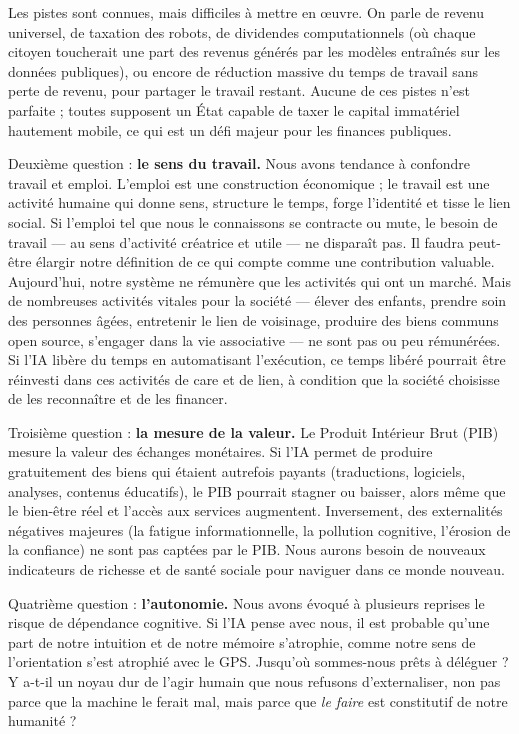 Les pistes sont connues, mais difficiles à mettre en œuvre. On parle de revenu universel, de taxation des robots, de dividendes computationnels (où chaque citoyen toucherait une part des revenus générés par les modèles entraînés sur les données publiques), ou encore de réduction massive du temps de travail sans perte de revenu, pour partager le travail restant. Aucune de ces pistes n'est parfaite ; toutes supposent un État capable de taxer le capital immatériel hautement mobile, ce qui est un défi majeur pour les finances publiques.

Deuxième question : \textbf{le sens du travail.} Nous avons tendance à confondre travail et emploi. L'emploi est une construction économique ; le travail est une activité humaine qui donne sens, structure le temps, forge l'identité et tisse le lien social. Si l'emploi tel que nous le connaissons se contracte ou mute, le besoin de travail — au sens d'activité créatrice et utile — ne disparaît pas. Il faudra peut-être élargir notre définition de ce qui compte comme une contribution valuable. Aujourd'hui, notre système ne rémunère que les activités qui ont un marché. Mais de nombreuses activités vitales pour la société — élever des enfants, prendre soin des personnes âgées, entretenir le lien de voisinage, produire des biens communs open source, s'engager dans la vie associative — ne sont pas ou peu rémunérées. Si l'IA libère du temps en automatisant l'exécution, ce temps libéré pourrait être réinvesti dans ces activités de care et de lien, à condition que la société choisisse de les reconnaître et de les financer.

Troisième question : \textbf{la mesure de la valeur.} Le Produit Intérieur Brut (PIB) mesure la valeur des échanges monétaires. Si l'IA permet de produire gratuitement des biens qui étaient autrefois payants (traductions, logiciels, analyses, contenus éducatifs), le PIB pourrait stagner ou baisser, alors même que le bien-être réel et l'accès aux services augmentent. Inversement, des externalités négatives majeures (la fatigue informationnelle, la pollution cognitive, l'érosion de la confiance) ne sont pas captées par le PIB. Nous aurons besoin de nouveaux indicateurs de richesse et de santé sociale pour naviguer dans ce monde nouveau.

Quatrième question : \textbf{l'autonomie.} Nous avons évoqué à plusieurs reprises le risque de dépendance cognitive. Si l'IA pense avec nous, il est probable qu'une part de notre intuition et de notre mémoire s'atrophie, comme notre sens de l'orientation s'est atrophié avec le GPS. Jusqu'où sommes-nous prêts à déléguer ? Y a-t-il un noyau dur de l'agir humain que nous refusons d'externaliser, non pas parce que la machine le ferait mal, mais parce que \emph{le faire} est constitutif de notre humanité ?

